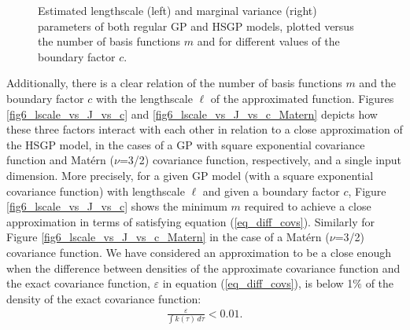 \documentclass[onecolumn,a4paper,11pt]{article}
\begin{document}
\begin{figure}
\caption{Estimated lengthscale (left) and marginal variance (right) parameters of both regular GP and HSGP models, plotted versus the number of basis functions $m$ and for different values of the boundary factor $c$.}
  \label{fig5_lscale_vs_J}
\end{figure}


Additionally, there is a clear relation of the number of basis functions $m$ and the boundary factor $c$ with the lengthscale $\ell$ of the approximated function. Figures \ref{fig6_lscale_vs_J_vs_c} and \ref{fig6_lscale_vs_J_vs_c_Matern} depicts how these three factors interact with each other in relation to a close approximation of the HSGP model, in the cases of a GP with square exponential covariance function and Mat\'ern ($\nu$=3/2) covariance function, respectively, and a single input dimension. More precisely, for a given GP model (with a square exponential covariance function) with lengthscale $\ell$ and given a boundary factor $c$, Figure \ref{fig6_lscale_vs_J_vs_c} shows the minimum $m$ required to achieve a close approximation in terms of satisfying equation (\ref{eq_diff_covs}). Similarly for Figure \ref{fig6_lscale_vs_J_vs_c_Matern} in the case of a Mat\'ern ($\nu$=3/2) covariance function. We have considered an approximation to be a close enough when the difference between densities of the approximate covariance function and the exact covariance function, $\varepsilon$ in equation (\ref{eq_diff_covs}), is below 1$\%$ of the density of the exact covariance function:
%
\begin{eqnarray*}
 \frac{\varepsilon}{\int k(\tau) \, d\tau} < 0.01.
\end{eqnarray*}
\end{document}
